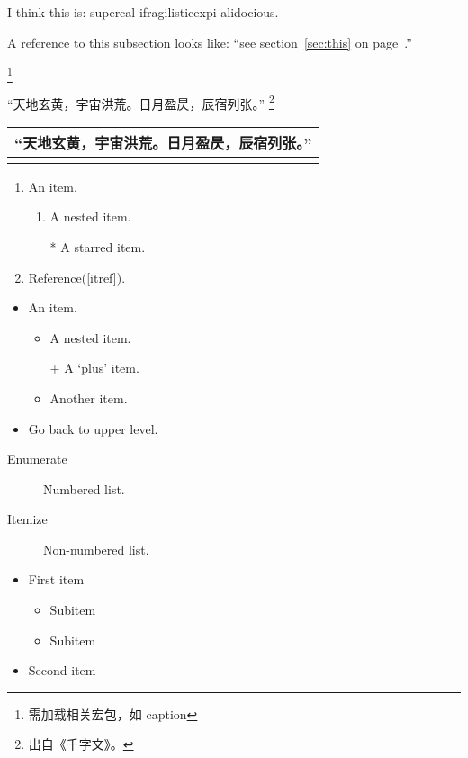 \documentclass[11pt,a4paper]{report}
\begin{document}
I think this is: su\-per\-cal\-%
i\-frag\-i\-lis\-tic\-ex\-pi\-%
al\-i\-do\-cious.

A reference to this subsection
\label{sec:this} looks like:
``see section~\ref{sec:this} on
page~\pageref{sec:this}.''

\footnote{需加载相关宏包，如 caption}

“天地玄黄，宇宙洪荒。日月盈昃，辰宿列张。” \footnote{出自《千字文》。 }
\newline

\begin{tabular}{l}
	\hline
	“天地玄黄，宇宙洪荒。日月盈昃，辰宿列张。” \footnotemark \\
	\hline
	\newline
\end{tabular}

	
\begin{enumerate}
	\item An item.
	\begin{enumerate}
		\item A nested item.\label{itref}
		\item[*] A starred item.
	\end{enumerate}
	\item Reference(\ref{itref}).
	\newline		
\end{enumerate}

\begin{itemize}
	\item An item.
	\begin{itemize}
		\item A nested item.
		\item[+] A `plus' item.
		\item Another item.
	\end{itemize}
	\item Go back to upper level.
	\newline
\end{itemize}

\begin{description}
	\item[Enumerate] Numbered list.
	\item[Itemize] Non-numbered list.
	\newline
\end{description}

\renewcommand{\labelitemi}{\ddag}
\renewcommand{\labelitemii}{\dag}
\begin{itemize}
	\item First item
	\begin{itemize}
		\item Subitem
		\item Subitem
	\end{itemize}
	\item Second item
\end{itemize}
\end{document}
